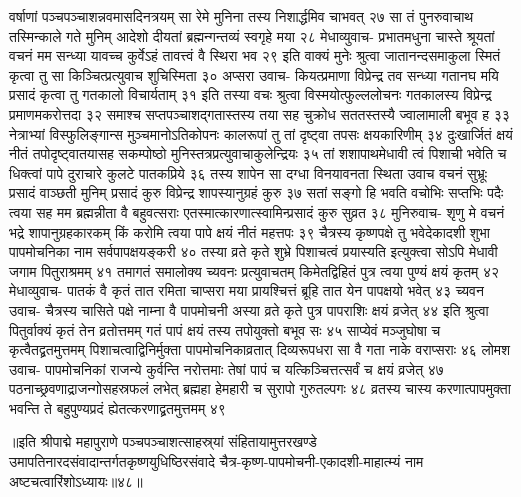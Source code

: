 वर्षाणां पञ्चपञ्चाशन्नवमासदिनत्रयम् 
सा रेमे मुनिना तस्य निशार्द्धमिव चाभवत् २७
सा तं पुनरुवाचाथ तस्मिन्काले गते मुनिम् 
आदेशो दीयतां ब्रह्मन्गन्तव्यं स्वगृहे मया २८
मेधाव्युवाच-
प्रभातमधुना चास्ते श्रूयतां वचनं मम 
सन्ध्या यावच्च कुर्वेऽहं तावत्त्वं वै स्थिरा भव २९
इति वाक्यं मुनेः श्रुत्वा जातानन्दसमाकुला 
स्मितं कृत्वा तु सा किञ्चित्प्रत्युवाच शुचिस्मिता ३०
अप्सरा उवाच-
कियत्प्रमाणा विप्रेन्द्र तव सन्ध्या गतानघ 
मयि प्रसादं कृत्वा तु गतकालो विचार्यताम् ३१
इति तस्या वचः श्रुत्वा विस्मयोत्फुल्ललोचनः 
गतकालस्य विप्रेन्द्र प्रमाणमकरोत्तदा ३२
समाश्च सप्तपञ्चाशद्गतास्तस्य तया सह 
चुक्रोध सततस्तस्यै ज्वालामाली बभूव ह ३३
नेत्राभ्यां विस्फुलिङ्गान्स मुञ्चमानोऽतिकोपनः 
कालरूपां तु तां दृष्ट्वा तपसः क्षयकारिणीम् ३४
दुःखार्जितं क्षयं नीतं तपोदृष्ट्वातयासह 
सकम्पोष्ठो मुनिस्तत्रप्रत्युवाचाकुलेन्द्रियः ३५
तां शशापाथमेधावी त्वं पिशाची भवेति च 
धिक्त्वां पापे दुराचारे कुलटे पातकप्रिये ३६
तस्य शापेन सा दग्धा विनयावनता स्थिता 
उवाच वचनं सुभ्रूः प्रसादं वाञ्छती मुनिम् 
प्रसादं कुरु विप्रेन्द्र शापस्यानुग्रहं कुरु ३७
सतां सङ्गो हि भवति वचोभिः सप्तभिः पदैः 
त्वया सह मम ब्रह्मन्नीता वै बहुवत्सराः 
एतस्मात्कारणात्स्वामिन्प्रसादं कुरु सुव्रत ३८
मुनिरुवाच-
शृणु मे वचनं भद्रे शापानुग्रहकारकम् 
किं करोमि त्वया पापे क्षयं नीतं महत्तपः ३९
चैत्रस्य कृष्णपक्षे तु भवेदेकादशी शुभा 
पापमोचनिका नाम सर्वपापक्षयङ्करी ४०
तस्या व्रते कृते शुभ्रे पिशाचत्वं प्रयास्यति 
इत्युक्त्वा सोऽपि मेधावी जगाम पितुराश्रमम् ४१
तमागतं समालोक्य च्यवनः प्रत्युवाचतम् 
किमेतद्विहितं पुत्र त्वया पुण्यं क्षयं कृतम् ४२
मेधाव्युवाच-
पातकं वै कृतं तात रमिता चाप्सरा मया 
प्रायश्चित्तं ब्रूहि तात येन पापक्षयो भवेत् ४३
च्यवन उवाच-
चैत्रस्य चासिते पक्षे नाम्ना वै पापमोचनी 
अस्या व्रते कृते पुत्र पापराशिः क्षयं व्रजेत् ४४
इति श्रुत्वा पितुर्वाक्यं कृतं तेन व्रतोत्तमम् 
गतं पापं क्षयं तस्य तपोयुक्तो बभूव सः ४५
साप्येवं मञ्जुघोषा च कृत्वैतद्व्रतमुत्तमम् 
पिशाचत्वाद्विनिर्मुक्ता पापमोचनिकाव्रतात् 
दिव्यरूपधरा सा वै गता नाके वराप्सराः ४६
लोमश उवाच-
पापमोचनिकां राजन्ये कुर्वन्ति नरोत्तमाः 
तेषां पापं च यत्किञ्चित्तत्सर्वं च क्षयं व्रजेत् ४७
पठनाच्छ्रवणाद्राजन्गोसहस्रफलं लभेत् 
ब्रह्महा हेमहारी च सुरापो गुरुतल्पगः ४८
व्रतस्य चास्य करणात्पापमुक्ता भवन्ति ते 
बहुपुण्यप्रदं ह्येतत्करणाद्व्रतमुत्तमम् ४९

॥इति श्रीपाद्मे महापुराणे पञ्चपञ्चाशत्साहस्र्यां संहितायामुत्तरखण्डे उमापतिनारदसंवादान्तर्गतकृष्णयुधिष्ठिरसंवादे चैत्र-कृष्ण-पापमोचनी-एकादशी-माहात्म्यं नाम अष्टचत्वारिंशोऽध्यायः॥४८॥



